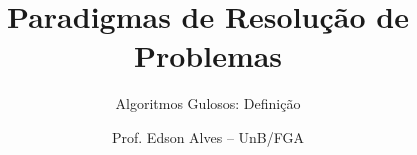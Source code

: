 \title{Paradigmas de Resolução de Problemas}
\subtitle{Algoritmos Gulosos: Definição}
\author{Prof. Edson Alves -- UnB/FGA}
\date{}
